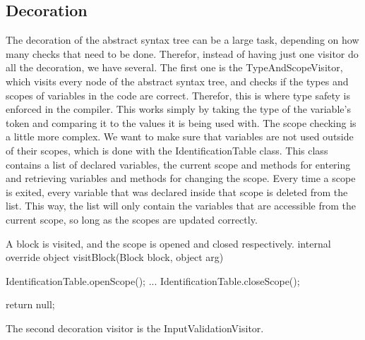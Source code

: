 \subsection{Decoration}
The decoration of the abstract syntax tree can be a large task, depending on how many checks that need to be done. 
Therefor, instead of having just one visitor do all the decoration, we have several. \newline
The first one is the TypeAndScopeVisitor, which visits every node of the abstract syntax tree, and checks if the types and scopes of variables in the code are correct.\newline
Therefor, this is where type safety is enforced in the compiler. 
This works simply by taking the type of the variable's token and comparing it to the values it is being used with. \newline
The scope checking is a little more complex. 
We want to make sure that variables are not used outside of their scopes, which is done with the IdentificationTable class. 
This class contains a list of declared variables, the current scope and methods for entering and retrieving variables and methods for changing the scope.\newline
Every time a scope is exited, every variable that was declared inside that scope is deleted from the list. 
This way, the list will only contain the variables that are accessible from the current scope, so long as the scopes are updated correctly.

\begin{source}{A block is visited, and the scope is opened and closed respectively.}{}
internal override object visitBlock(Block block, object arg)
		{
        IdentificationTable.openScope();
        ...
        IdentificationTable.closeScope();

        return null;
     }
\end{source}

The second decoration visitor is the InputValidationVisitor.  